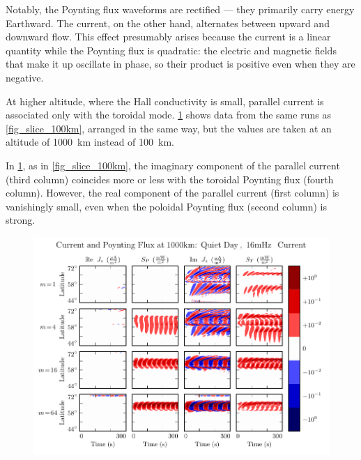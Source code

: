 Notably, the Poynting flux waveforms are rectified --- they primarily carry energy Earthward. The current, on the other hand, alternates between upward and downward flow. This effect presumably arises because the current is a linear quantity while the Poynting flux is quadratic: the electric and magnetic fields that make it up oscillate in phase, so their product is positive even when they are negative. 


At higher altitude, where the Hall conductivity is small, parallel current is associated only with the toroidal mode. \cref{fig_slice_1000km} shows data from the same runs as \cref{fig_slice_100km}, arranged in the same way, but the values are taken at an altitude of \SI{1000}{\km} instead of \SI{100}{\km}. 

In \cref{fig_slice_1000km}, as in \cref{fig_slice_100km}, the imaginary component of the parallel current (third column) coincides more or less with the toroidal Poynting flux (fourth column). However, the real component of the parallel current (first column) is vanishingly small, even when the poloidal Poynting flux (second column) is strong. 

\begin{figure}[!htb]
    \centering
    \includegraphics[width=\textwidth]{figures/slice_1000km.pdf}
    \caption[Current and Poynting Flux at \SI{1000}{\km}]{
      \todo{$\cdots$}
    }
    \label{fig_slice_1000km}
\end{figure}

